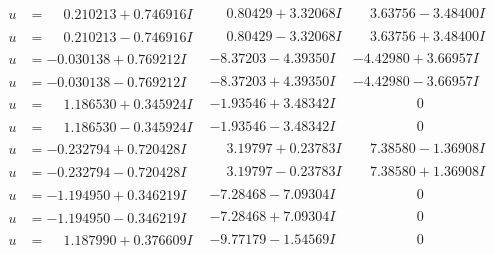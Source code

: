 \documentclass[1p]{elsarticle_modified}
\theoremstyle{definition}
\begin{document}
$$\begin{array}{c|c|c}
\begin{aligned}
u &= \phantom{-}0.210213 + 0.746916 I\end{aligned}
 & \phantom{-}0.80429 + 3.32068 I & \phantom{-}3.63756 - 3.48400 I \\ \hline\begin{aligned}
u &= \phantom{-}0.210213 - 0.746916 I\end{aligned}
 & \phantom{-}0.80429 - 3.32068 I & \phantom{-}3.63756 + 3.48400 I \\ \hline\begin{aligned}
u &= -0.030138 + 0.769212 I\end{aligned}
 & -8.37203 - 4.39350 I & -4.42980 + 3.66957 I \\ \hline\begin{aligned}
u &= -0.030138 - 0.769212 I\end{aligned}
 & -8.37203 + 4.39350 I & -4.42980 - 3.66957 I \\ \hline\begin{aligned}
u &= \phantom{-}1.186530 + 0.345924 I\end{aligned}
 & -1.93546 + 3.48342 I & \phantom{-0.000000 } 0 \\ \hline\begin{aligned}
u &= \phantom{-}1.186530 - 0.345924 I\end{aligned}
 & -1.93546 - 3.48342 I & \phantom{-0.000000 } 0 \\ \hline\begin{aligned}
u &= -0.232794 + 0.720428 I\end{aligned}
 & \phantom{-}3.19797 + 0.23783 I & \phantom{-}7.38580 - 1.36908 I \\ \hline\begin{aligned}
u &= -0.232794 - 0.720428 I\end{aligned}
 & \phantom{-}3.19797 - 0.23783 I & \phantom{-}7.38580 + 1.36908 I \\ \hline\begin{aligned}
u &= -1.194950 + 0.346219 I\end{aligned}
 & -7.28468 - 7.09304 I & \phantom{-0.000000 } 0 \\ \hline\begin{aligned}
u &= -1.194950 - 0.346219 I\end{aligned}
 & -7.28468 + 7.09304 I & \phantom{-0.000000 } 0 \\ \hline\begin{aligned}
u &= \phantom{-}1.187990 + 0.376609 I\end{aligned}
 & -9.77179 - 1.54569 I & \phantom{-0.000000 } 0 \\ \hline\begin{aligned}

\end{aligned}
\end{array}$$
\end{document}
